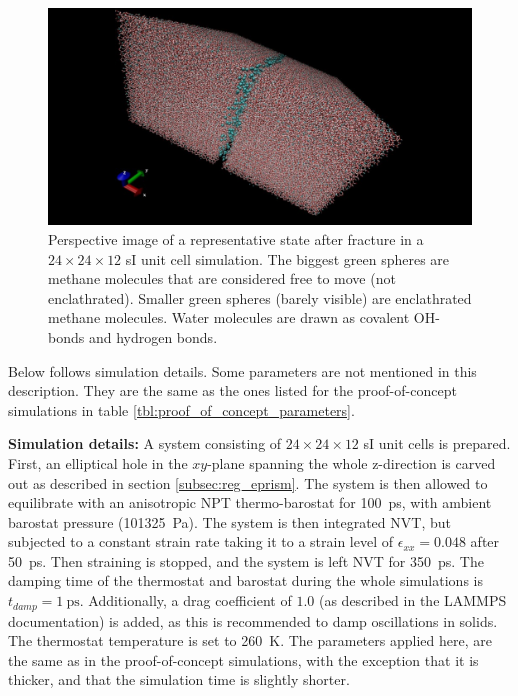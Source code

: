 \begin{figure}
\includegraphics[width=\textwidth]{../pictures/system_1048.pdf}
\caption{Perspective image of a representative state after fracture in a $24\times 24 \times 12$ sI unit cell simulation. The biggest green spheres are methane molecules that are considered free to move (not enclathrated). Smaller green spheres (barely visible) are enclathrated methane molecules. Water molecules are drawn as covalent OH-bonds and hydrogen bonds.}
\label{fig:system_1048}
\end{figure}

Below follows simulation details. Some parameters are not mentioned in this description. They are the same as the ones listed for the proof-of-concept simulations in table \ref{tbl:proof_of_concept_parameters}.
\begin{framed} 
\textbf{Simulation details:} A system consisting of $24 \times 24\times 12$ sI unit cells is prepared. First, an elliptical hole in the $xy$-plane spanning the whole z-direction is carved out as described in section \ref{subsec:reg_eprism}. The system is then allowed to equilibrate with an anisotropic NPT thermo-barostat for \SI{100}{\pico\second}, with ambient barostat pressure (\SI{101325}{\pascal}). The system is then integrated NVT, but subjected to a constant strain rate taking it to a strain level of $\epsilon_{xx} = 0.048$ after \SI{50}{\pico\second}. Then straining is stopped, and the system is left NVT for \SI{350}{\pico\second}. The damping time of the thermostat and barostat during the whole simulations is $t_{damp} = \SI{1}{\ps}$. Additionally, a drag coefficient of $1.0$ (as described in the LAMMPS documentation) is added, as this is recommended to damp oscillations in solids. The thermostat temperature is set to \SI{260}{\kelvin}. The parameters applied here, are the same as in the proof-of-concept simulations, with the exception that it is thicker, and that the simulation time is slightly shorter.
\end{framed}

